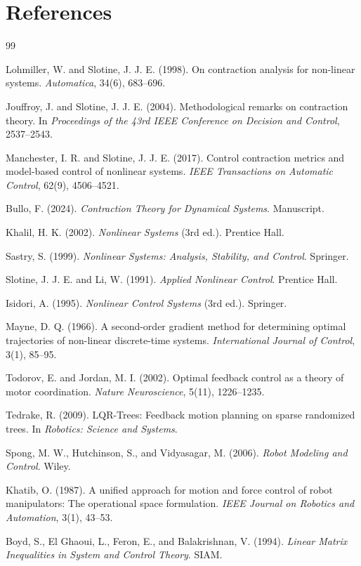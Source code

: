 \documentclass[11pt,letterpaper]{article}
\begin{document}
\section*{References}

\begin{thebibliography}{99}

Lohmiller, W. and Slotine, J. J. E. (1998).
On contraction analysis for non-linear systems.
\emph{Automatica}, 34(6), 683--696.

Jouffroy, J. and Slotine, J. J. E. (2004).
Methodological remarks on contraction theory.
In \emph{Proceedings of the 43rd IEEE Conference on Decision and Control}, 2537--2543.

Manchester, I. R. and Slotine, J. J. E. (2017).
Control contraction metrics and model-based control of nonlinear systems.
\emph{IEEE Transactions on Automatic Control}, 62(9), 4506--4521.

Bullo, F. (2024).
\emph{Contraction Theory for Dynamical Systems}.
Manuscript.

Khalil, H. K. (2002).
\emph{Nonlinear Systems} (3rd ed.).
Prentice Hall.

Sastry, S. (1999).
\emph{Nonlinear Systems: Analysis, Stability, and Control}.
Springer.

Slotine, J. J. E. and Li, W. (1991).
\emph{Applied Nonlinear Control}.
Prentice Hall.

Isidori, A. (1995).
\emph{Nonlinear Control Systems} (3rd ed.).
Springer.

Mayne, D. Q. (1966).
A second-order gradient method for determining optimal trajectories of non-linear discrete-time systems.
\emph{International Journal of Control}, 3(1), 85--95.

Todorov, E. and Jordan, M. I. (2002).
Optimal feedback control as a theory of motor coordination.
\emph{Nature Neuroscience}, 5(11), 1226--1235.

Tedrake, R. (2009).
LQR-Trees: Feedback motion planning on sparse randomized trees.
In \emph{Robotics: Science and Systems}.

Spong, M. W., Hutchinson, S., and Vidyasagar, M. (2006).
\emph{Robot Modeling and Control}.
Wiley.

Khatib, O. (1987).
A unified approach for motion and force control of robot manipulators: The operational space formulation.
\emph{IEEE Journal on Robotics and Automation}, 3(1), 43--53.

Boyd, S., El Ghaoui, L., Feron, E., and Balakrishnan, V. (1994).
\emph{Linear Matrix Inequalities in System and Control Theory}.
SIAM.

\end{thebibliography}
\end{document}
